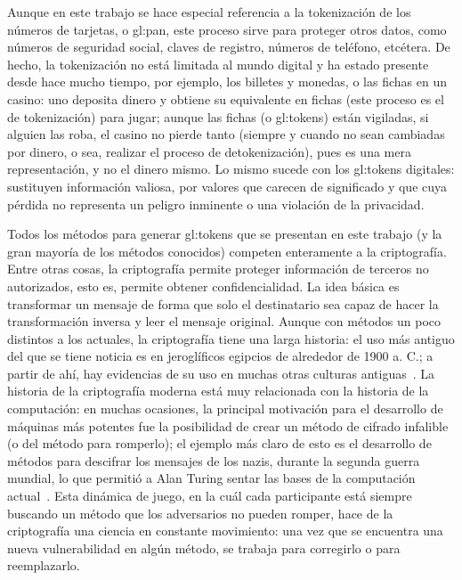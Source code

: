 
Aunque en este trabajo se hace especial referencia a la tokenización de los
números de tarjetas, o \gls{gl:pan}, este proceso sirve para proteger otros
datos, como números de seguridad social, claves de registro, números de
teléfono, etcétera. De hecho, la tokenización no está limitada al mundo digital
y ha estado presente desde hace mucho tiempo, por ejemplo, los billetes y
monedas, o las fichas en un casino: uno deposita dinero y obtiene su
equivalente en fichas (este proceso es el de tokenización) para jugar; aunque
las fichas (o \glspl{gl:token}) están vigiladas, si alguien las roba, el casino
no pierde tanto (siempre y cuando no sean cambiadas por dinero, o sea, realizar
el proceso de detokenización), pues es una mera representación, y no el dinero
mismo. Lo mismo sucede con los \glspl{gl:token} digitales: sustituyen
información valiosa, por valores que carecen de significado y que cuya pérdida
no representa un peligro inminente o una violación de la privacidad.

Todos los métodos para generar \glspl{gl:token} que se presentan en este trabajo
(y la gran mayoría de los métodos conocidos) competen enteramente a la
criptografía. Entre otras cosas, la criptografía permite proteger información de
terceros no autorizados, esto es, permite obtener confidencialidad. La idea
básica es transformar un mensaje de forma que solo el destinatario sea capaz
de hacer la transformación inversa y leer el mensaje original. Aunque con
métodos un poco distintos a los actuales, la criptografía tiene una larga
historia: el uso más antiguo del que se tiene noticia es en jeroglíficos
egipcios de alrededor de 1900 a. C.; a partir de ahí, hay evidencias de su uso
en muchas otras culturas antiguas~\cite{codebreakers}. La historia de la
criptografía moderna está muy relacionada con la historia de la computación: en
muchas ocasiones, la principal motivación para el desarrollo de máquinas más
potentes fue la posibilidad de crear un método de cifrado infalible (o del
método para romperlo); el ejemplo más claro de esto es el desarrollo de
métodos para descifrar los mensajes de los nazis, durante la segunda guerra
mundial, lo que permitió a Alan Turing sentar las bases de la computación
actual~\cite{simon_singht}. Esta dinámica de juego, en la cuál cada participante
está siempre buscando un método que los adversarios no pueden romper,
hace de la criptografía una ciencia en constante movimiento: una vez que
se encuentra una nueva vulnerabilidad en algún método, se trabaja para
corregirlo o para reemplazarlo.

